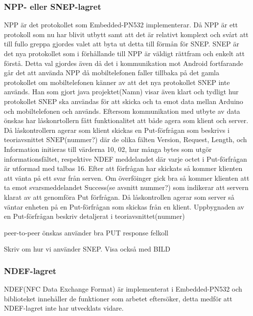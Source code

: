 \documentclass[11pt]{article}
\begin{document}

\subsubsection{NPP- eller SNEP-lagret}
NPP är det protokollet som Embedded-PN532 implementerar. Då NPP är ett protokoll som nu har blivit utbytt samt att det är relativt komplext och svårt att till fullo greppa gjordes valet att byta ut detta till förmån för SNEP. SNEP är det nya protokollet som i förhållande till NPP är väldigt rättfram och enkelt att förstå. Detta val gjordes även då det i kommunikation mot Android fortfarande går det att använda NPP då mobiltelefonen faller tillbaka på det gamla protokollet om mobiltelefonen känner av att det nya protokollet SNEP inte används. Han som gjort java projektet(Namn) visar även klart och tydligt hur protokollet SNEP ska användas för att skicka och ta emot data mellan Arduino och mobiltelefonen och används. Eftersom kommunikation med utbyte av data önskas har låskonrtollern fått funktionalitet att både agera som klient och server. Då låskontrollern agerar som klient skickas en Put-förfrågan som beskrivs i teoriavsnittet SNEP(nummer?) där de olika fälten Version, Request, Length, och Information initieras till värderna 10, 02, hur många bytes som utgör informationsfältet, respektive NDEF meddelandet där varje octet i Put-förfrågan är utformad med talbas 16. Efter att förfrågan har skickats så kommer klienten att vänta på ett svar från serven. Om överföinger gick bra så kommer klienten att ta emot svarsmeddelandet Success(se avsnitt nummer?) som indikerar att servern klarat av att genomföra Put förfrågan. Då låskontrollen agerar som server så väntar enheten på en Put-förfrågan som skickas från en klient. Uppbygnaden av en Put-förfrågan beskriv detaljerat i teoriavsnittet(nummer) 

peer-to-peer önskas använder bra PUT
response 
felkoll

Skriv om hur vi använder SNEP. Visa också med BILD

\subsubsection{NDEF-lagret}
NDEF(NFC Data Exchange Format) är implementerat i Embedded-PN532 och biblioteket innehåller de funktioner som arbetet eftersöker, detta medför att NDEF-lagret inte har utvecklats vidare. 
\end{document}
